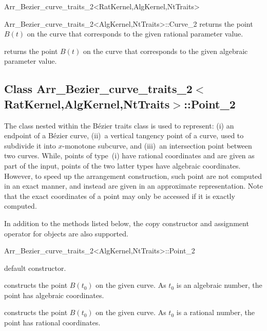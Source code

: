 \begin{ccRefClass}{Arr_Bezier_curve_traits_2<RatKernel,AlgKernel,NtTraits>}
\begin{ccClass}{Arr_Bezier_curve_traits_2<AlgKernel,NtTraits>::Curve_2}
  {returns the point $B(t)$ on the curve that corresponds to the given
   rational parameter value.}

  {returns the point $B(t)$ on the curve that corresponds to the given
   algebraic parameter value.}

\end{ccClass}


\subsection*{Class
         Arr\_Bezier\_curve\_traits\_2$<$RatKernel,AlgKernel,NtTraits$>$::Point\_2}

The  class nested within the B\'ezier traits class is used
to represent: (i) an endpoint of a B\'ezier curve, (ii)~a vertical tangency
point of a curve, used to subdivide it into $x$-monotone subcurve, and
(iii)~an intersection point between two curves. While, points of type~(i) have
rational coordinates and are given as part of the input, points of the two
latter types have algebraic coordinates. However, to speed up the arrangement
construction, such point are not computed in an exact manner, and instead
are given in an approximate representation. Note that the exact coordinates
of a point may only be accessed if it is exactly computed.

In addition to the methods listed below, the copy constructor and assignment
operator for  objects are also supported.

\begin{ccClass}{Arr_Bezier_curve_traits_2<AlgKernel,NtTraits>::Point_2}

\ccCreation
{}

  {default constructor.}

  {constructs the point $B(t_0)$ on the given curve. As $t_0$ is an
   algebraic number, the point has algebraic coordinates.}

  {constructs the point $B(t_0)$ on the given curve. As $t_0$ is a
   rational number, the point has rational coordinates.}


\end{ccClass}
\end{ccRefClass}
